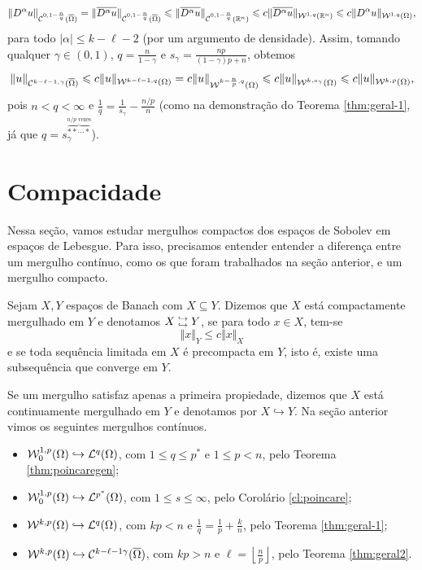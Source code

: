 \begin{prf}
    \[
        \Vert D^\alpha u \Vert_{\mathcal{C}^{0,1-\frac{n}{q}}(\overline\Omega)} = \Vert \overline{D^\alpha u} \Vert_{\mathcal{C}^{0,1-\frac{n}{q}}(\overline\Omega)} \leqslant \Vert \overline{D^\alpha u} \Vert_{\mathcal{C}^{0,1 - \frac{n}{q}}(\mathbb{R}^n)} \leqslant c \Vert \overline{D^\alpha u} \Vert_{\mathcal{W}^{1,q}(\mathbb{R}^n)} \leqslant c \Vert D^\alpha u \Vert_{\mathcal{W}^{1,q}(\Omega)},
    \]
    para todo $|\alpha| \leqslant k - \ell - 2$ (por um argumento de densidade).
    Assim, tomando qualquer $\gamma \in (0,1)$, $q = \frac{n}{1 - \gamma}$ e $s_\gamma = \frac{np}{(1- \gamma)p + n}$, obtemos
    \[
        \Vert u \Vert_{\mathcal{C}^{k-\ell-1,\gamma}(\overline\Omega)} \leqslant c\Vert u \Vert_{\mathcal{W}^{k-\ell-1,q}(\Omega)} = c \Vert u \Vert_{\mathcal{W}^{k-\frac{n}{p},q}(\Omega)} \leqslant c \Vert u \Vert_{\mathcal{W}^{k,s_\gamma}(\Omega)} \leqslant c \Vert u \Vert_{\mathcal{W}^{k,p}(\Omega)},
    \]
    pois $n < q < \infty$ e $\frac{1}{q} = \frac{1}{s_\gamma} - \frac{n/p}{n}$ (como na demonstração do Teorema \ref{thm:geral-1}, já que $q = s_\gamma^{\overbrace{**\cdots*}^{n/p \text{ vezes}}}$).
\end{prf}

\section{Compacidade}

Nessa seção, vamos estudar mergulhos compactos dos espaços de Sobolev em espaços de Lebesgue.
Para isso, precisamos entender entender a diferença entre um mergulho contínuo, como os que foram trabalhados na seção anterior, e um mergulho compacto.

\begin{dbox}
    Sejam $X, Y$ espaços de Banach com $X \subseteq Y$. Dizemos que $X$ está compactamente mergulhado em $Y$ e denotamos $X \;\substack{\hookrightarrow \\ \hookrightarrow}\; Y$,
    se para todo $x \in X$, tem-se
    \[
        \Vert x \Vert_{Y} \leqslant c \Vert x \Vert_X
    \]
    e se toda sequência limitada em $X$ é precompacta em $Y$, isto é, existe uma subsequência que converge em $Y$.
\end{dbox}

\obs Se um mergulho satisfaz apenas a primeira propiedade, dizemos que $X$ está continuamente mergulhado em $Y$ e denotamos por $X \hookrightarrow Y$. Na seção anterior vimos os seguintes mergulhos contínuos.
\begin{itemize}
    \item $\mathcal{W}^{1,p}_0(\Omega) \hookrightarrow \mathcal{L}^q(\Omega)$, com $1 \leqslant q \leqslant p^*$ e $1 \leqslant p < n$, pelo Teorema \ref{thm:poincaregen};
    \item $\mathcal{W}^{1,p}_0(\Omega) \hookrightarrow \mathcal{L}^{p^*}(\Omega)$, com $1 \leqslant s \leqslant \infty$, pelo Corolário \ref{cl:poincare};
    \item $\mathcal{W}^{k,p}(\Omega) \hookrightarrow \mathcal{L}^q(\Omega)$, com $kp < n$ e $\frac{1}{q} = \frac{1}{p} + \frac{k}{n}$, pelo Teorema \ref{thm:geral-1};
    \item $\mathcal{W}^{k,p}(\Omega) \hookrightarrow \mathcal{C}^{k-\ell-1\gamma}(\overline\Omega)$, com $kp > n$ e $\ell = \left\lfloor \frac{n}{p} \right\rfloor$, pelo Teorema \ref{thm:geral2}.
\end{itemize}

